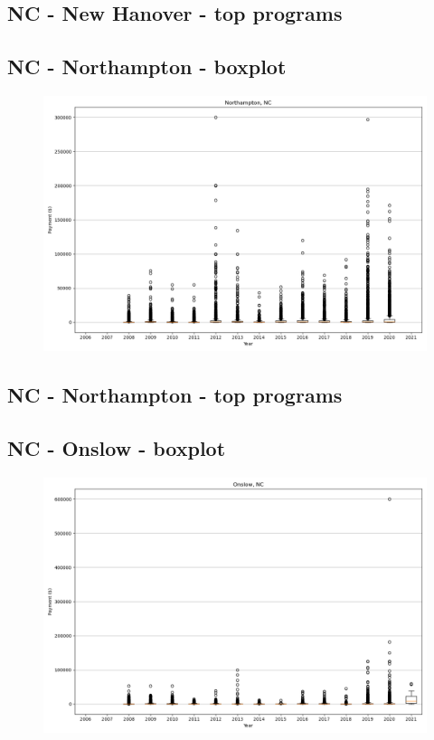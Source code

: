 \subsection*{NC - New Hanover - top programs}

\newpage
\subsection*{NC - Northampton - boxplot}
\begin{figure}[h]
\centering
\includegraphics[width=7in]{../output/boxplots/counties/Northampton-NC_boxplot.png}
\end{figure}


\subsection*{NC - Northampton - top programs}

\newpage
\subsection*{NC - Onslow - boxplot}
\begin{figure}[h]
\centering
\includegraphics[width=7in]{../output/boxplots/counties/Onslow-NC_boxplot.png}
\end{figure}


